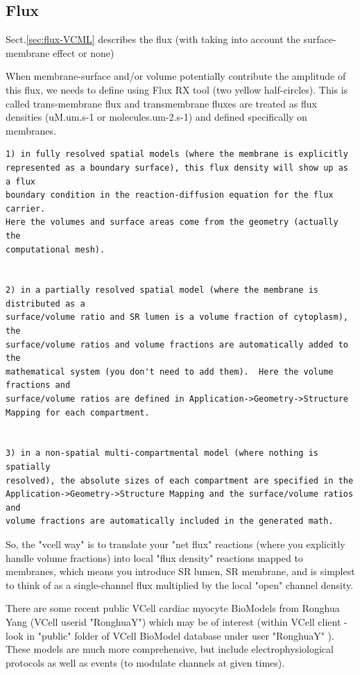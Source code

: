 \subsection{Flux}

Sect.\ref{sec:flux-VCML} describes the flux (with taking into account the
surface-membrane effect or none)

When membrane-surface and/or volume potentially contribute the amplitude of this
flux, we needs to define using Flux RX tool (two yellow half-circles).
This is called trans-membrane flux and 
transmembrane fluxes are treated as flux densities (uM.um.s-1 or
molecules.um-2.s-1) and defined specifically on membranes.  

\begin{verbatim}
1) in fully resolved spatial models (where the membrane is explicitly
represented as a boundary surface), this flux density will show up as a flux
boundary condition in the reaction-diffusion equation for the flux carrier. 
Here the volumes and surface areas come from the geometry (actually the
computational mesh).    


2) in a partially resolved spatial model (where the membrane is distributed as a
surface/volume ratio and SR lumen is a volume fraction of cytoplasm), the
surface/volume ratios and volume fractions are automatically added to the
mathematical system (you don't need to add them).  Here the volume fractions and
surface/volume ratios are defined in Application->Geometry->Structure Mapping for each compartment.    


3) in a non-spatial multi-compartmental model (where nothing is spatially
resolved), the absolute sizes of each compartment are specified in the
Application->Geometry->Structure Mapping and the surface/volume ratios and
volume fractions are automatically included in the generated math.    

\end{verbatim}


So, the "vcell way" is to translate your "net flux" reactions (where you
explicitly handle volume fractions) into local "flux density" reactions mapped
to membranes, which means you introduce SR lumen, SR membrane, and is simplest
to think of as a single-channel flux multiplied by the local "open" channel
density.


There are some recent public VCell cardiac myocyte BioModels from Ronghua Yang
(VCell userid "RonghuaY") which may be of interest (within VCell client - look
in "public" folder of VCell BioModel database under user "RonghuaY" ).  These
models are much more comprehensive, but include electrophysiological protocols
as well as events (to modulate channels at given times).

